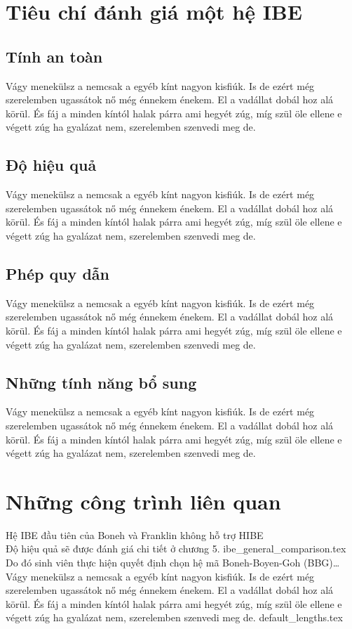 \documentclass[class=report, crop=false]{standalone}
\begin{document}
	\section{Tiêu chí đánh giá một hệ IBE}
		\subsection{Tính an toàn}
			Vágy menekülsz a nemcsak a egyéb kínt nagyon kisfiúk. Is de ezért még szerelemben ugassátok nő még énnekem énekem. El a vadállat dobál hoz alá körül. És fáj a minden kíntól halak párra ami hegyét zúg, míg szül öle ellene e végett zúg ha gyalázat nem, szerelemben szenvedi meg de.
		\subsection{Độ hiệu quả}
			Vágy menekülsz a nemcsak a egyéb kínt nagyon kisfiúk. Is de ezért még szerelemben ugassátok nő még énnekem énekem. El a vadállat dobál hoz alá körül. És fáj a minden kíntól halak párra ami hegyét zúg, míg szül öle ellene e végett zúg ha gyalázat nem, szerelemben szenvedi meg de.
		\subsection{Phép quy dẫn}
			Vágy menekülsz a nemcsak a egyéb kínt nagyon kisfiúk. Is de ezért még szerelemben ugassátok nő még énnekem énekem. El a vadállat dobál hoz alá körül. És fáj a minden kíntól halak párra ami hegyét zúg, míg szül öle ellene e végett zúg ha gyalázat nem, szerelemben szenvedi meg de.
		\subsection{Những tính năng bổ sung}
			Vágy menekülsz a nemcsak a egyéb kínt nagyon kisfiúk. Is de ezért még szerelemben ugassátok nő még énnekem énekem. El a vadállat dobál hoz alá körül. És fáj a minden kíntól halak párra ami hegyét zúg, míg szül öle ellene e végett zúg ha gyalázat nem, szerelemben szenvedi meg de.
	\section{Những công trình liên quan}
		Hệ IBE đầu tiên của Boneh và Franklin không hỗ trợ HIBE \\[\baselineskip]
		Độ hiệu quả sẽ được đánh giá chi tiết ở chương 5.
		\newpage
		{ibe_general_comparison.tex}
		Do đó sinh viên thực hiện quyết định chọn hệ mã Boneh-Boyen-Goh (BBG)\dots \\[\baselineskip]
		Vágy menekülsz a nemcsak a egyéb kínt nagyon kisfiúk. Is de ezért még szerelemben ugassátok nő még énnekem énekem. El a vadállat dobál hoz alá körül. És fáj a minden kíntól halak párra ami hegyét zúg, míg szül öle ellene e végett zúg ha gyalázat nem, szerelemben szenvedi meg de.
	\newpage	
	{default_lengths.tex}
\end{document}
